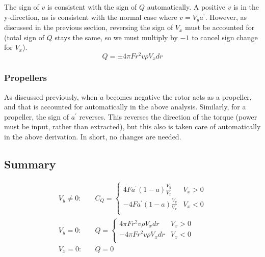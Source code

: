 \documentclass{article}
\begin{document}
The sign of $v$ is consistent with the sign of $Q$ automatically.  A positive $v$ is in the y-direction, as is consistent with the normal case where $v = V_y a^\prime$.  However, as discussed in the previous section, reversing the sign of $V_x$ must be accounted for (total sign of $Q$ stays the same, so we must multiply by $-1$ to cancel sign change for $V_x$).
\begin{equation}
    Q = \pm 4 \pi F r^2 v \rho V_x dr
\end{equation}



\subsubsection{Propellers}

As discussed previously, when $a$ becomes negative the rotor acts as a propeller, and that is accounted for automatically in the above analysis.  Similarly, for a propeller, the sign of $a^\prime$ reverses.  This reverses the direction of the torque (power must be input, rather than extracted), but this also is taken care of automatically in the above derivation.  In short, no changes are needed.

\subsection{Summary}



\begin{equation}
\begin{aligned}
    V_y \ne 0:&\quad
    C_Q = \begin{cases}
        4 F a^\prime (1-a) \frac{V_y}{V_x} &  V_x > 0 \\
        - 4 F a^\prime (1-a) \frac{V_y}{V_x} &  V_x < 0 \\
    \end{cases}\\
    V_y = 0:&\quad
    Q = \begin{cases}
        4 \pi F r^2 v \rho V_x dr &  V_x > 0 \\
        -4 \pi F r^2 v \rho V_x dr &  V_x < 0 \\
    \end{cases}\\
    V_x = 0:&\quad Q = 0\\
\end{aligned}
\label{eq:CQmom}
\end{equation}
\end{document}
